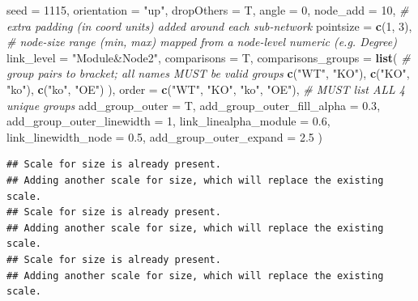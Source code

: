 \documentclass[
]{book}
\newenvironment{Shaded}{\begin{snugshade}}{\end{snugshade}}
\newcommand{\AttributeTok}[1]{\textcolor[rgb]{0.13,0.29,0.53}{#1}}
\newcommand{\CommentTok}[1]{\textcolor[rgb]{0.56,0.35,0.01}{\textit{#1}}}
\newcommand{\DecValTok}[1]{\textcolor[rgb]{0.00,0.00,0.81}{#1}}
\newcommand{\FloatTok}[1]{\textcolor[rgb]{0.00,0.00,0.81}{#1}}
\newcommand{\FunctionTok}[1]{\textcolor[rgb]{0.13,0.29,0.53}{\textbf{#1}}}
\newcommand{\NormalTok}[1]{#1}
\newcommand{\StringTok}[1]{\textcolor[rgb]{0.31,0.60,0.02}{#1}}
\begin{document}
\begin{Shaded}
\begin{Highlighting}[]
  \AttributeTok{seed                         =} \DecValTok{1115}\NormalTok{,}
  \AttributeTok{orientation                  =} \StringTok{"up"}\NormalTok{,}
  \AttributeTok{dropOthers                   =}\NormalTok{ T,}
  \AttributeTok{angle                        =} \DecValTok{0}\NormalTok{,}
  \AttributeTok{node\_add                     =} \DecValTok{10}\NormalTok{,            }\CommentTok{\# extra padding (in coord units) added around each sub{-}network}
  \AttributeTok{pointsize                    =} \FunctionTok{c}\NormalTok{(}\DecValTok{1}\NormalTok{, }\DecValTok{3}\NormalTok{),       }\CommentTok{\# node{-}size range (min, max) mapped from a node{-}level numeric (e.g. Degree)}
  \AttributeTok{link\_level                   =} \StringTok{"Module\&Node2"}\NormalTok{,}
  \AttributeTok{comparisons                  =}\NormalTok{ T,}
  \AttributeTok{comparisons\_groups           =} \FunctionTok{list}\NormalTok{(          }\CommentTok{\# group pairs to bracket; all names MUST be valid groups}
    \FunctionTok{c}\NormalTok{(}\StringTok{"WT"}\NormalTok{, }\StringTok{"KO"}\NormalTok{),}
    \FunctionTok{c}\NormalTok{(}\StringTok{"KO"}\NormalTok{, }\StringTok{"ko"}\NormalTok{),}
    \FunctionTok{c}\NormalTok{(}\StringTok{"ko"}\NormalTok{, }\StringTok{"OE"}\NormalTok{)}
\NormalTok{  ),}
  \AttributeTok{order                        =} \FunctionTok{c}\NormalTok{(}\StringTok{"WT"}\NormalTok{, }\StringTok{"KO"}\NormalTok{, }\StringTok{"ko"}\NormalTok{, }\StringTok{"OE"}\NormalTok{),  }\CommentTok{\# MUST list ALL 4 unique groups}
  \AttributeTok{add\_group\_outer              =}\NormalTok{ T,}
  \AttributeTok{add\_group\_outer\_fill\_alpha   =} \FloatTok{0.3}\NormalTok{,}
  \AttributeTok{add\_group\_outer\_linewidth    =} \DecValTok{1}\NormalTok{,}
  \AttributeTok{link\_linealpha\_module        =} \FloatTok{0.6}\NormalTok{,}
  \AttributeTok{link\_linewidth\_node          =} \FloatTok{0.5}\NormalTok{,}
  \AttributeTok{add\_group\_outer\_expand       =} \FloatTok{2.5}
\NormalTok{)}
\end{Highlighting}
\end{Shaded}

\begin{verbatim}
## Scale for size is already present.
## Adding another scale for size, which will replace the existing scale.
## Scale for size is already present.
## Adding another scale for size, which will replace the existing scale.
## Scale for size is already present.
## Adding another scale for size, which will replace the existing scale.
\end{verbatim}
\end{document}
